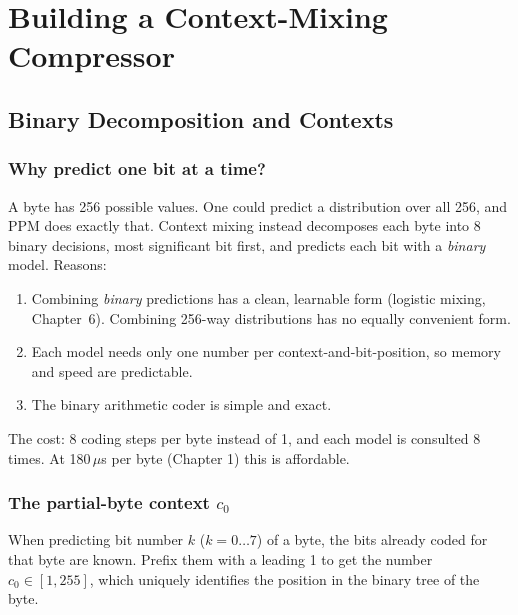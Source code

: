 \documentclass[11pt,a4paper,openany]{book}
\theoremstyle{definition}
\theoremstyle{remark}
\begin{document}
\part{Building a Context-Mixing Compressor}

\chapter{Binary Decomposition and Contexts}

\section{Why predict one bit at a time?}

A byte has 256 possible values. One could predict a distribution over all 256, and PPM does exactly that. Context mixing instead decomposes each byte into 8 binary decisions, most significant bit first, and predicts each bit with a \emph{binary} model. Reasons:
\begin{enumerate}
\item Combining \emph{binary} predictions has a clean, learnable form (logistic mixing, Chapter~6). Combining 256-way distributions has no equally convenient form.
\item Each model needs only one number per context-and-bit-position, so memory and speed are predictable.
\item The binary arithmetic coder is simple and exact.
\end{enumerate}
The cost: 8 coding steps per byte instead of 1, and each model is consulted 8 times. At 180\,$\mu$s per byte (Chapter 1) this is affordable.

\section{The partial-byte context $c_0$}

When predicting bit number $k$ ($k=0\ldots7$) of a byte, the bits already coded for that byte are known. Prefix them with a leading 1 to get the number $c_0\in[1,255]$, which uniquely identifies the position in the binary tree of the byte.
\end{document}
